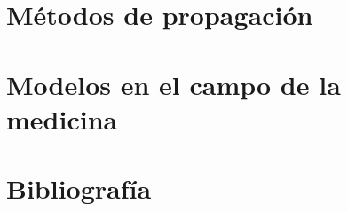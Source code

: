 \documentclass{article}
\begin{document}
\section{Métodos de propagación}

\section{Modelos en el campo de la medicina}

\section{Bibliografía}
\end{document}
